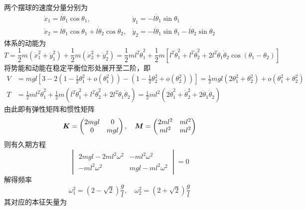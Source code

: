 \begin{example}[双摆]
两个摆球的速度分量分别为
\begin{equation*}
\begin{array}{ll}
	\dot{x}_1 = l \dot{\theta}_1\cos\theta_1,& \dot{y}_1 = -l \dot{\theta}_1\sin\theta_1 \\
	\dot{x}_2 = l \dot{\theta}_1\cos\theta_1+l \dot{\theta}_2\cos\theta_2,& \dot{y}_2 = -l \dot{\theta}_1\sin\theta_1-l \dot{\theta}_2\sin\theta_2
\end{array}
\end{equation*}
体系的动能为
\begin{equation*}
	T = \frac12 m(\dot{x}_1^2+\dot{y}_1^2) + \frac12 m(\dot{x}_2^2+\dot{y}_2^2) = \frac12 ml^2 \dot{\theta}_1^2 + \frac12 m\left[l^2 \dot{\theta}_1^2 + l^2 \dot{\theta}_2^2 + 2l^2 \dot{\theta}_1 \dot{\theta}_2 \cos (\theta_1 - \theta_2)\right]
\end{equation*}
将势能和动能在稳定平衡位形处展开至二阶，即
\begin{align*}
	V & = mgl\left[3-2\left(1-\frac12 \theta_1^2+o(\theta_1^2)\right)-\left(1-\frac12 \theta_2^2+o(\theta_2^2)\right)\right] = \frac12 mgl(2\theta_1^2 + \theta_2^2) + o(\theta_1^2+\theta_2^2) \\
	T & = \frac12 ml^2 \dot{\theta}_1^2 + \frac12 m\left(l^2 \dot{\theta}_1^2 + l^2 \dot{\theta}_2^2 + 2l^2 \dot{\theta}_1 \dot{\theta}_2\right) = \frac12 ml^2 \left(2\dot{\theta}_1^2+\dot{\theta}_2^2+ 2\dot{\theta}_1\dot{\theta}_2\right)
\end{align*}
由此即有弹性矩阵和惯性矩阵
\begin{equation*}
	\boldsymbol{K} = \begin{pmatrix} 2mgl & 0 \\ 0 & mgl \end{pmatrix},\quad \boldsymbol{M} = \begin{pmatrix} 2ml^2 & ml^2 \\ ml^2 & ml^2 \end{pmatrix}
\end{equation*}
则有久期方程
\begin{equation*}
	\begin{vmatrix}
		2mgl-2ml^2 \omega^2 & -ml^2\omega^2 \\
		-ml^2\omega^2 & mgl-ml^2\omega^2
	\end{vmatrix} = 0
\end{equation*}
解得频率
\begin{equation*}
	\omega_1^2 = (2-\sqrt{2})\frac{g}{l},\quad \omega_2^2 = (2+\sqrt{2})\frac{g}{l}
\end{equation*}
其对应的本征矢量为

\end{example}
